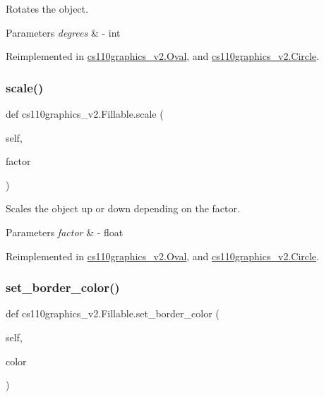 Rotates the object. 


\begin{DoxyParams}{Parameters}
{\em degrees} & -\/ int \\
\hline
\end{DoxyParams}


Reimplemented in \mbox{\hyperlink{classcs110graphics__v2_1_1Oval_af8c159d2ab0f84dd27099639c9b002d3}{cs110graphics\+\_\+v2.\+Oval}}, and \mbox{\hyperlink{classcs110graphics__v2_1_1Circle_aabea5d516684d384910e7309ed0aba31}{cs110graphics\+\_\+v2.\+Circle}}.

\mbox{\label{classcs110graphics__v2_1_1Fillable_af023a8511e9e9149214a3bf8e3a50aae}} 
\subsubsection{\texorpdfstring{scale()}{scale()}}
{\footnotesize\ttfamily def cs110graphics\+\_\+v2.\+Fillable.\+scale (\begin{DoxyParamCaption}\item[{}]{self,  }\item[{}]{factor }\end{DoxyParamCaption})}



Scales the object up or down depending on the factor. 


\begin{DoxyParams}{Parameters}
{\em factor} & -\/ float \\
\hline
\end{DoxyParams}


Reimplemented in \mbox{\hyperlink{classcs110graphics__v2_1_1Oval_abb433bbfccb014b097f09c063530a4e0}{cs110graphics\+\_\+v2.\+Oval}}, and \mbox{\hyperlink{classcs110graphics__v2_1_1Circle_a4a04c8a0ec27e30f3fd5af5fe428423b}{cs110graphics\+\_\+v2.\+Circle}}.

\mbox{\label{classcs110graphics__v2_1_1Fillable_a1da4fb755538b915c79913f1a17dcbf7}} 
\subsubsection{\texorpdfstring{set\_border\_color()}{set\_border\_color()}}
{\footnotesize\ttfamily def cs110graphics\+\_\+v2.\+Fillable.\+set\+\_\+border\+\_\+color (\begin{DoxyParamCaption}\item[{}]{self,  }\item[{}]{color }\end{DoxyParamCaption})}



